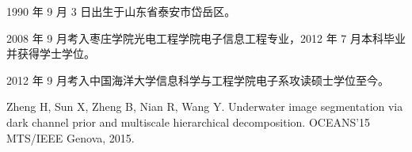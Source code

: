 \begin{resume}


  1990 年 9 月 3 日出生于山东省泰安市岱岳区。
  
  2008 年 9 月考入枣庄学院光电工程学院电子信息工程专业，2012 年 7 月本科毕业并获得学士学位。
  
  2012 年 9 月考入中国海洋大学信息科学与工程学院电子系攻读硕士学位至今。


  \begin{enumerate}[{[}1{]}]
  \item Zheng H, Sun X, Zheng B, Nian R, Wang Y. Underwater image segmentation via dark channel prior and multiscale hierarchical decomposition. OCEANS'15 MTS/IEEE Genova, 2015.
  \end{enumerate}

\end{resume}
